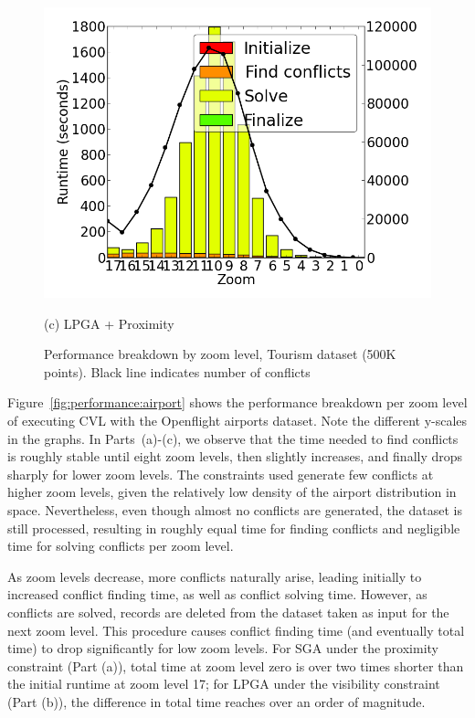 \begin{figure}[tb]
\begin{minipage}{0.329\linewidth}
    \centerline{\includegraphics[width=1.0\linewidth]{./figs/prelim_pnt_500k_tourism_lp_B.png}}
    \centerline{(c) LPGA + Proximity}
  \end{minipage}
  \vspace{-0ex}
  \caption{Performance breakdown by zoom level, Tourism dataset (500K points). Black line indicates number of conflicts} \label{fig:performance:tourism}
  \vspace{-2ex}
\end{figure}

 Figure~\ref{fig:performance:airport} shows the performance breakdown per zoom level of executing CVL with the Openflight airports dataset. Note the different y-scales in the graphs. In Parts~(a)-(c), we observe that the time needed to find conflicts is roughly stable until eight zoom levels, then slightly increases, and finally drops sharply for lower zoom levels. The constraints used generate few conflicts at higher zoom levels, given the relatively low density of the airport distribution in space. Nevertheless, even though almost no conflicts are generated, the dataset is still processed, resulting in roughly equal time for finding conflicts and negligible time for solving conflicts per zoom level. 
 
As zoom levels decrease, more conflicts naturally arise, leading initially to increased conflict finding time, as well as conflict solving time. However, as conflicts are solved, records are deleted from the dataset taken as input for the next zoom level. This procedure causes conflict finding time (and eventually total time) to drop significantly for low zoom levels. For SGA under the proximity constraint (Part (a)), total time at zoom level zero is over two times shorter than the initial runtime at zoom level 17; for LPGA under the visibility constraint (Part (b)), the difference in total time reaches over an order of magnitude.  

